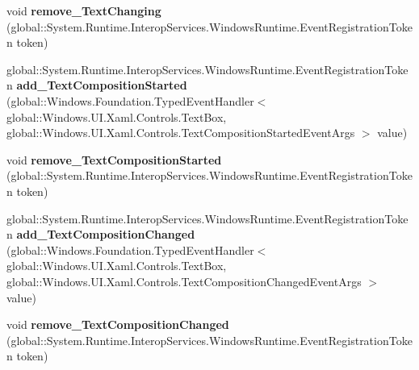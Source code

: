 \begin{DoxyCompactItemize}
\item 
\mbox{\label{interface_windows_1_1_u_i_1_1_xaml_1_1_controls_1_1_i_text_box3_ab1b93537fe8078d2bd946a3a5a093e83}} 
void {\bfseries remove\+\_\+\+Text\+Changing} (global\+::\+System.\+Runtime.\+Interop\+Services.\+Windows\+Runtime.\+Event\+Registration\+Token token)
\item 
\mbox{\label{interface_windows_1_1_u_i_1_1_xaml_1_1_controls_1_1_i_text_box3_ad4742435a40d61b4eacf33adf68ea53f}} 
global\+::\+System.\+Runtime.\+Interop\+Services.\+Windows\+Runtime.\+Event\+Registration\+Token {\bfseries add\+\_\+\+Text\+Composition\+Started} (global\+::\+Windows.\+Foundation.\+Typed\+Event\+Handler$<$ global\+::\+Windows.\+U\+I.\+Xaml.\+Controls.\+Text\+Box, global\+::\+Windows.\+U\+I.\+Xaml.\+Controls.\+Text\+Composition\+Started\+Event\+Args $>$ value)
\item 
\mbox{\label{interface_windows_1_1_u_i_1_1_xaml_1_1_controls_1_1_i_text_box3_a23f2d618ba42f695a3dbb9b869e8da34}} 
void {\bfseries remove\+\_\+\+Text\+Composition\+Started} (global\+::\+System.\+Runtime.\+Interop\+Services.\+Windows\+Runtime.\+Event\+Registration\+Token token)
\item 
\mbox{\label{interface_windows_1_1_u_i_1_1_xaml_1_1_controls_1_1_i_text_box3_ac0297f19faa2bba0bee10cc8a43661e3}} 
global\+::\+System.\+Runtime.\+Interop\+Services.\+Windows\+Runtime.\+Event\+Registration\+Token {\bfseries add\+\_\+\+Text\+Composition\+Changed} (global\+::\+Windows.\+Foundation.\+Typed\+Event\+Handler$<$ global\+::\+Windows.\+U\+I.\+Xaml.\+Controls.\+Text\+Box, global\+::\+Windows.\+U\+I.\+Xaml.\+Controls.\+Text\+Composition\+Changed\+Event\+Args $>$ value)
\item 
\mbox{\label{interface_windows_1_1_u_i_1_1_xaml_1_1_controls_1_1_i_text_box3_a534bf7d3625db3f5d85c0082e35b4b68}} 
void {\bfseries remove\+\_\+\+Text\+Composition\+Changed} (global\+::\+System.\+Runtime.\+Interop\+Services.\+Windows\+Runtime.\+Event\+Registration\+Token token)
\item 

\end{DoxyCompactItemize}
